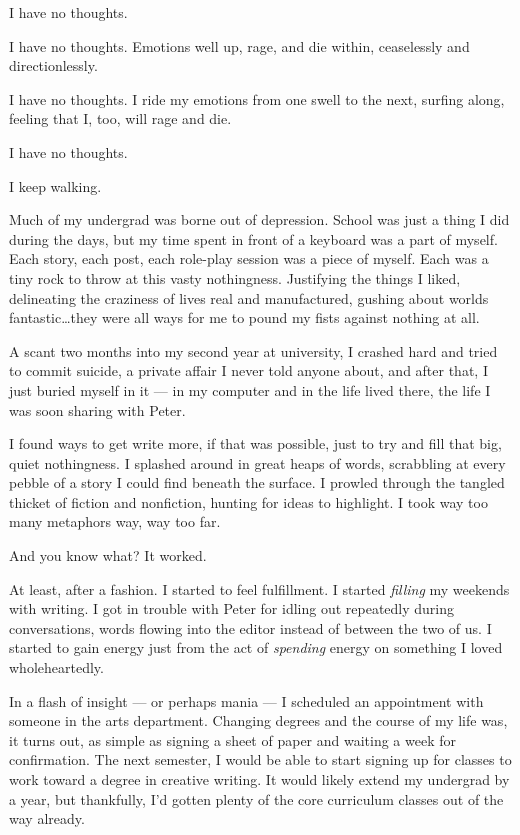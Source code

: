 I have no thoughts.

I have no thoughts. Emotions well up, rage, and die within, ceaselessly and directionlessly.

I have no thoughts. I ride my emotions from one swell to the next, surfing along, feeling that I, too, will rage and die.

I have no thoughts.

I keep walking.

\secdiv{}

\noindent Much of my undergrad was borne out of depression. School was just a thing I did during the days, but my time spent in front of a keyboard was a part of myself. Each story, each post, each role-play session was a piece of myself. Each was a tiny rock to throw at this vasty nothingness. Justifying the things I liked, delineating the craziness of lives real and manufactured, gushing about worlds fantastic\ldots{}they were all ways for me to pound my fists against nothing at all.

A scant two months into my second year at university, I crashed hard and tried to commit suicide, a private affair I never told anyone about, and after that, I just buried myself in it --- in my computer and in the life lived there, the life I was soon sharing with Peter.

I found ways to get write more, if that was possible, just to try and fill that big, quiet nothingness. I splashed around in great heaps of words, scrabbling at every pebble of a story I could find beneath the surface. I prowled through the tangled thicket of fiction and nonfiction, hunting for ideas to highlight. I took way too many metaphors way, way too far.

And you know what? It worked.

At least, after a fashion. I started to feel fulfillment. I started \emph{filling} my weekends with writing. I got in trouble with Peter for idling out repeatedly during conversations, words flowing into the editor instead of between the two of us. I started to gain energy just from the act of \emph{spending} energy on something I loved wholeheartedly.

In a flash of insight --- or perhaps mania --- I scheduled an appointment with someone in the arts department. Changing degrees and the course of my life was, it turns out, as simple as signing a sheet of paper and waiting a week for confirmation. The next semester, I would be able to start signing up for classes to work toward a degree in creative writing. It would likely extend my undergrad by a year, but thankfully, I'd gotten plenty of the core curriculum classes out of the way already.

